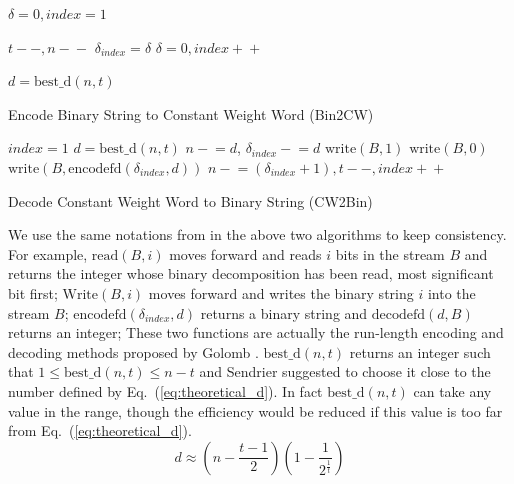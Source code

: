 \documentclass[10pt,journal,compsoc]{IEEEtran}
\begin{document}
\begin{algorithm}[h]
	
	\DontPrintSemicolon %
    $\delta = 0, index = 1$\;
	 {
    	 {
    		$t\!\!-\!\!-, n\!\!-\!\!-$\;
            $\delta_{index} = \delta$\;
            $\delta = 0, index\!\!+\!\!+$\;
    	}{
    		$d = \text{best\_d}(n,t)$\;
    		
    	}
    }
	
		
	\caption{Encode Binary String to Constant Weight Word (Bin2CW)}\label{alg:encoding}
\end{algorithm}

\begin{algorithm}[h]
	
	\DontPrintSemicolon %
    $index = 1$\;
	 {
        $d = \text{best\_d}(n,t)$\;
    	 {
    		$n -\!\!= d$, $\delta_{index} -\!\!= d$ \;
            $\text{write}(B,1)$\;
    	}{
            $\text{write}(B,0)$\;
            $\text{write}(B,\text{encodefd}(\delta_{index},d))$\;
            $n -\!\!= (\delta_{index}+1), t\!\!-\!\!-, index\!\!+\!\!+$\;	
    	}
    }
	
		
	\caption{Decode Constant Weight Word to Binary String (CW2Bin)}\label{alg:decoding}
\end{algorithm}

We use the same notations from \cite{sendrier2005encoding} in the above two algorithms   to keep consistency. For example, $\text{read}(B,i)$ moves forward and reads $i$ bits in the stream $B$ and returns the integer whose binary decomposition has been read, most significant bit first;
$\text{Write}(B,i)$ moves forward and writes the binary string $i$ into the stream $B$;
$\text{encodefd}(\delta_{index},d)$ returns a binary string and $\text{decodefd}(d,B)$ returns an integer; These two functions are actually the run-length encoding and decoding methods proposed by Golomb \cite{goloumb1966run,sendrier2005encoding}.
$\text{best\_d}(n,t)$ returns an integer such that $1\leq \text{best\_d}(n,t) \leq n-t$ and Sendrier suggested to choose it close to the number defined by Eq.~(\ref{eq:theoretical_d}). In fact $\text{best\_d}(n,t)$ can take any value in the range, though the efficiency would be reduced if this value is  too far from Eq.~(\ref{eq:theoretical_d}).
\begin{equation}\label{eq:theoretical_d}
d \approx (n-\frac{t-1}{2})(1-\frac{1}{2^{\frac{1}{t}}})
\end{equation}
\end{document}
